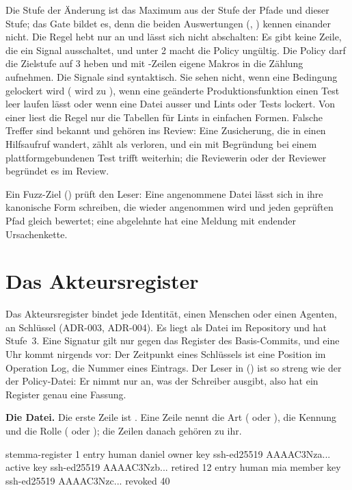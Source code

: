 Die Stufe der Änderung ist das Maximum aus der Stufe der Pfade und dieser Stufe;
das Gate bildet es, denn die beiden Auswertungen (, ) kennen
einander nicht.
Die Regel hebt nur an und lässt sich nicht abschalten:
Es gibt keine Zeile, die ein Signal ausschaltet, und  unter 2 macht die
Policy ungültig.
Die Policy darf die Zielstufe auf 3 heben und mit -Zeilen eigene Makros in die
Zählung aufnehmen.
Die Signale sind syntaktisch.
Sie sehen nicht, wenn eine Bedingung gelockert wird (\type{==} wird zu \type{>=}),
wenn eine geänderte Produktionsfunktion einen Test leer laufen lässt
oder wenn eine Datei ausser  und  Lints oder Tests lockert.
Von einer  liest die Regel nur die Tabellen für Lints in einfachen Formen.
Falsche Treffer sind bekannt und gehören ins Review:
Eine Zusicherung, die in einen Hilfsaufruf wandert, zählt als verloren,
und ein \type{#[ignore]} mit Begründung bei einem plattformgebundenen Test trifft weiterhin;
die Reviewerin oder der Reviewer begründet es im Review.

Ein Fuzz-Ziel () prüft den Leser:
Eine angenommene Datei lässt sich in ihre kanonische Form schreiben, die wieder angenommen wird
und jeden geprüften Pfad gleich bewertet;
eine abgelehnte hat eine Meldung mit endender Ursachenkette.

\section[sec:register]{Das Akteursregister}

Das Akteursregister bindet jede Identität, einen Menschen oder einen Agenten, an Schlüssel
(ADR-003, ADR-004).
Es liegt als Datei  im Repository und hat Stufe~3.
Eine Signatur gilt nur gegen das Register des Basis-Commits, und eine Uhr kommt nirgends vor:
Der Zeitpunkt eines Schlüssels ist eine Position im Operation Log, die Nummer eines Eintrags.
Der Leser in  () ist so streng wie der der Policy-Datei:
Er nimmt nur an, was der Schreiber ausgibt, also hat ein Register genau eine Fassung.

{\bf Die Datei.}
Die erste Zeile ist .
Eine Zeile  nennt die Art ( oder ), die Kennung
und die Rolle ( oder ); die Zeilen  danach gehören zu ihr.

\starttyping
stemma-register 1
entry human daniel owner
key ssh-ed25519 AAAAC3Nza... active
key ssh-ed25519 AAAAC3Nzb... retired 12
entry human mia member
key ssh-ed25519 AAAAC3Nzc... revoked 40
\stoptyping

